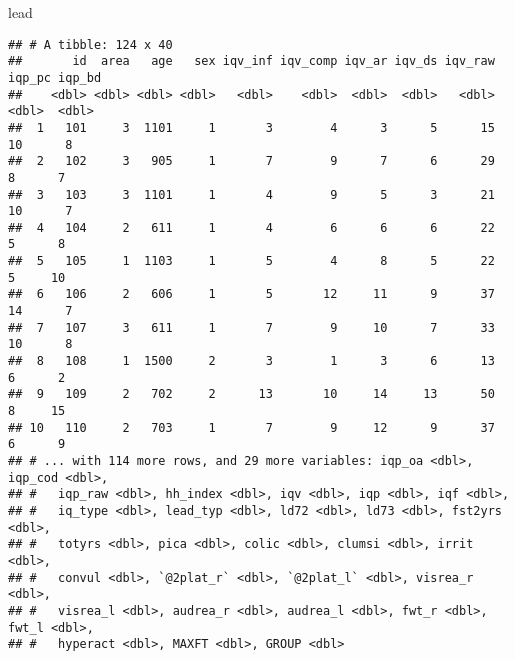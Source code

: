 \documentclass[
]{article}
\newenvironment{Shaded}{\begin{snugshade}}{\end{snugshade}}
\newcommand{\CommentTok}[1]{\textcolor[rgb]{0.56,0.35,0.01}{\textit{#1}}}
\newcommand{\DataTypeTok}[1]{\textcolor[rgb]{0.13,0.29,0.53}{#1}}
\newcommand{\KeywordTok}[1]{\textcolor[rgb]{0.13,0.29,0.53}{\textbf{#1}}}
\newcommand{\NormalTok}[1]{#1}
\newcommand{\OperatorTok}[1]{\textcolor[rgb]{0.81,0.36,0.00}{\textbf{#1}}}
\newcommand{\StringTok}[1]{\textcolor[rgb]{0.31,0.60,0.02}{#1}}
\begin{document}
\begin{Shaded}
\begin{Highlighting}[]
\NormalTok{lead}
\end{Highlighting}
\end{Shaded}

\begin{verbatim}
## # A tibble: 124 x 40
##       id  area   age   sex iqv_inf iqv_comp iqv_ar iqv_ds iqv_raw iqp_pc iqp_bd
##    <dbl> <dbl> <dbl> <dbl>   <dbl>    <dbl>  <dbl>  <dbl>   <dbl>  <dbl>  <dbl>
##  1   101     3  1101     1       3        4      3      5      15     10      8
##  2   102     3   905     1       7        9      7      6      29      8      7
##  3   103     3  1101     1       4        9      5      3      21     10      7
##  4   104     2   611     1       4        6      6      6      22      5      8
##  5   105     1  1103     1       5        4      8      5      22      5     10
##  6   106     2   606     1       5       12     11      9      37     14      7
##  7   107     3   611     1       7        9     10      7      33     10      8
##  8   108     1  1500     2       3        1      3      6      13      6      2
##  9   109     2   702     2      13       10     14     13      50      8     15
## 10   110     2   703     1       7        9     12      9      37      6      9
## # ... with 114 more rows, and 29 more variables: iqp_oa <dbl>, iqp_cod <dbl>,
## #   iqp_raw <dbl>, hh_index <dbl>, iqv <dbl>, iqp <dbl>, iqf <dbl>,
## #   iq_type <dbl>, lead_typ <dbl>, ld72 <dbl>, ld73 <dbl>, fst2yrs <dbl>,
## #   totyrs <dbl>, pica <dbl>, colic <dbl>, clumsi <dbl>, irrit <dbl>,
## #   convul <dbl>, `@2plat_r` <dbl>, `@2plat_l` <dbl>, visrea_r <dbl>,
## #   visrea_l <dbl>, audrea_r <dbl>, audrea_l <dbl>, fwt_r <dbl>, fwt_l <dbl>,
## #   hyperact <dbl>, MAXFT <dbl>, GROUP <dbl>
\end{verbatim}

\begin{Shaded}
\end{Shaded}
\end{document}
